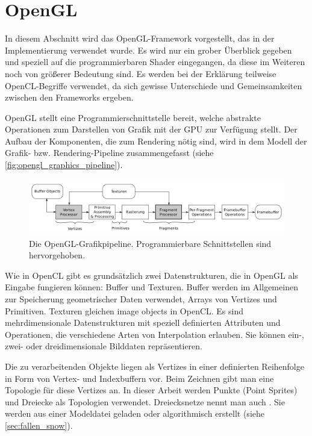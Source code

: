  \section{OpenGL}
\label{sec:opengl}

In diesem Abschnitt wird das OpenGL-Framework vorgestellt, das in der
Implementierung verwendet wurde. Es wird nur ein grober Überblick
gegeben und speziell auf die programmierbaren Shader eingegangen, da
diese im Weiteren noch von größerer Bedeutung sind. Es werden bei der
Erklärung teilweise OpenCL-Begriffe verwendet, da sich gewisse
Unterschiede und Gemeinsamkeiten zwischen den Frameworks ergeben.

OpenGL stellt eine Programmierschnittstelle bereit, welche abstrakte
Operationen zum Darstellen von Grafik mit der GPU zur Verfügung
stellt. Der Aufbau der Komponenten, die zum Rendering nötig sind, wird
in dem Modell der Grafik- bzw. Rendering-Pipeline zusammengefasst
(siehe \autoref{fig:opengl_graphics_pipeline}).

\begin{figure}[ht]
\centering
\includegraphics[width=15cm]{images/graphics_pipeline}
\caption{Die OpenGL-Grafikpipeline. Programmierbare Schnittstellen sind hervorgehoben.}
\label{fig:opengl_graphics_pipeline}
\end{figure}

Wie in OpenCL gibt es grundsätzlich zwei Datenstrukturen, die in
OpenGL als Eingabe fungieren können: Buffer und Texturen. Buffer
werden im Allgemeinen zur Speicherung geometrischer Daten verwendet,
\Pimiddydh Arrays von Vertizes und Primitiven. Texturen gleichen image
objects in OpenCL. Es sind mehrdimensionale Datenstrukturen mit
speziell definierten Attributen und Operationen, die \PimiddyzB
verschiedene Arten von Interpolation erlauben. Sie können ein-, zwei-
oder dreidimensionale Bilddaten repräsentieren.

Die zu verarbeitenden Objekte liegen als Vertizes in einer definierten
Reihenfolge in Form von Vertex- und Indexbuffern vor. Beim Zeichnen
gibt man eine Topologie für diese Vertizes an. In dieser Arbeit werden
Punkte (Point Sprites) und Dreiecke als Topologien
verwendet. Dreiecksnetze nennt man auch . Sie
werden \PimiddyzB aus einer Modeldatei geladen oder algorithmisch
erstellt (siehe \autoref{sec:fallen_snow}).

